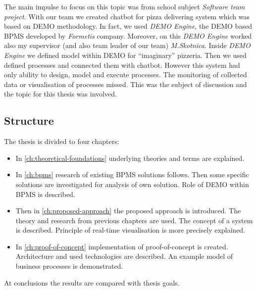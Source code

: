 
The main impulse to focus on this topic was from school subject \textit{Software team project}. With our team we created chatbot for pizza delivering system which was based on DEMO methodology. In fact, we used \textit{DEMO Engine}, the DEMO based BPMS developed by \textit{Formetis} company. Moreover, on this \textit{DEMO Engine} worked also my supervisor (and also team leader of our team) \textit{M.Skotnica}. Inside \textit{DEMO Engine} we defined model within DEMO for ``imaginary'' pizzeria. Then we used defined processes and connected them with chatbot. However this system had only ability to design, model and execute processes. The monitoring of collected data or visualisation of processes missed. This was the subject of discussion and the topic for this thesis was involved. 

\subsection{Structure}
The thesis is divided to four chapters:
\begin{itemize}
\item In \cref{ch:theoretical-foundations} underlying theories and terms are explained.
\item In \cref{ch:bpms} research of existing BPMS solutions follows. Then some specific solutions are investigated for analysis of own solution. Role of DEMO within BPMS is described. 
\item Then in \cref{ch:proposed-approach} the proposed approach is introduced. The theory and research from previous chapters are used. The concept of a system is described. Principle of real-time visualisation is more precisely explained. 
\item In \cref{ch:proof-of-concept} implementation of proof-of-concept is created. Architecture and used technologies are described. An example model of business processes is demonstrated.
\end{itemize}
At conclusions the results are compared with thesis goals.




